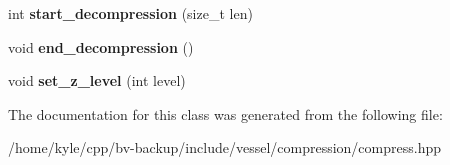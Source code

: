 \begin{DoxyCompactItemize}
int {\bfseries start\+\_\+decompression} (size\+\_\+t len)
\item 
\mbox{\label{class_vessel_1_1_compression_1_1_compressor_a98a1e40f28e4a5a4470e448de6f0ffa9}} 
void {\bfseries end\+\_\+decompression} ()
\item 
\mbox{\label{class_vessel_1_1_compression_1_1_compressor_a72aec2904f8998c202a8b75870257d13}} 
void {\bfseries set\+\_\+z\+\_\+level} (int level)
\end{DoxyCompactItemize}


The documentation for this class was generated from the following file\+:\begin{DoxyCompactItemize}
\item 
/home/kyle/cpp/bv-\/backup/include/vessel/compression/compress.\+hpp\end{DoxyCompactItemize}
